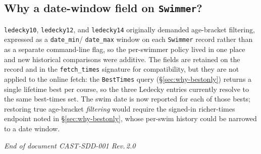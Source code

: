 \documentclass[12pt]{article}
\newcommand{\code}[1]{\texttt{#1}}
\begin{document}
\subsection{Why a date-window field on \texttt{Swimmer}?}

\code{ledecky10}, \code{ledecky12}, and \code{ledecky14} originally
demanded age-bracket filtering, expressed as a \code{date\_min}/%
\code{date\_max} window on each \code{Swimmer} record rather than as a
separate command-line flag, so the per-swimmer policy lived in one
place and new historical comparisons were additive.  The fields are
retained on the record and in the \code{fetch\_times} signature for
compatibility, but they are not applied to the online fetch: the
\code{BestTimes} query (\S\ref{sec:why-bestonly}) returns a single
lifetime best per course, so the three Ledecky entries currently
resolve to the same best-times set.  The swim date is now reported for
each of those bests; restoring true age-bracket \emph{filtering} would
require the signed-in richer-times endpoint noted in
\S\ref{sec:why-bestonly}, whose per-swim history could be narrowed to a
date window.

\vfill
\begin{center}
  \small\textit{End of document CAST-SDD-001 Rev.\,2.0}
\end{center}
\end{document}
